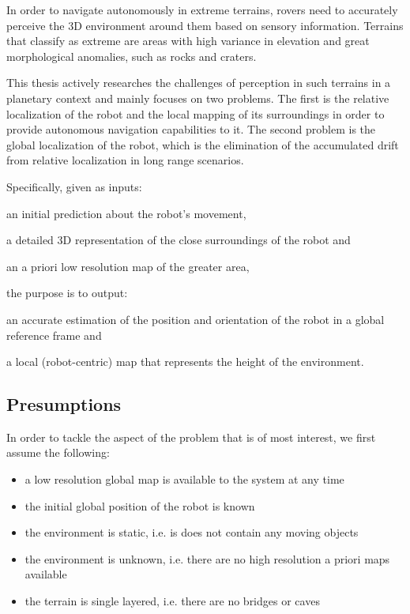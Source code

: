 In order to navigate autonomously in extreme terrains, rovers need to
accurately perceive the 3D environment around them based on sensory
information.
Terrains that classify as extreme are areas with high variance in elevation
and great morphological anomalies, such as rocks and craters.

This thesis actively researches the challenges of perception in such terrains
in a planetary context and mainly focuses on two problems.
The first is the relative localization of the robot and the local mapping
of its surroundings in order to provide autonomous navigation capabilities
to it.
The second problem is the global localization of the robot, which is the
elimination of the accumulated drift from relative localization in long
range scenarios.

Specifically, given as inputs:
\begin{enumerate*}[label=(\roman*)]
    \item an initial prediction about the robot's movement,
    \item a detailed 3D representation of the close surroundings of the robot
        and
    \item an a priori low resolution map of the greater area,
\end{enumerate*}
the purpose is to output:
\begin{enumerate*}[label=(\roman*)]
    \item an accurate estimation of the position and orientation of the
        robot in a global reference frame and
    \item a local (robot-centric) map that represents the height of
        the environment.
\end{enumerate*}

\subsection{Presumptions}

In order to tackle the aspect of the problem that is of most interest,
we first assume the following:

\begin{itemize}
    \item a low resolution global map is available to the system at any time
    \item the initial global position of the robot is known
    \item the environment is static, i.e. is does not contain any
        moving objects
    \item the environment is unknown, i.e. there are no high resolution
        a priori maps available
    \item the terrain is single layered, i.e. there are no bridges or caves
\end{itemize}


